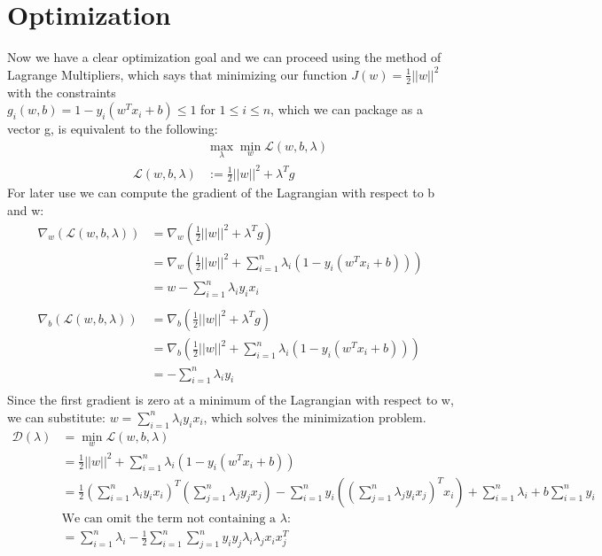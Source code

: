 \documentclass[12pt]{article}
\begin{document}
\section*{Optimization}
Now we have a clear optimization goal and we can proceed using the method of Lagrange Multipliers,
which says that minimizing our function $J(w) = \frac{1}{2}||w||^2$ with the constraints  \\ $g_i(w, b) = 1 - y_i(w^Tx_i + b) \leq 1$
for $1 \leq i \leq n$, which we can package as a vector g, is equivalent to the following:
\begin{align*}
    &\displaystyle \max_{\lambda} \min_w \mathcal{L}(w, b, \lambda) \\
    \mathcal{L}(w, b, \lambda) &:= \frac{1}{2}||w||^2  + \lambda^T g
\end{align*}
For later use we can compute the gradient of the Lagrangian with respect to b and w:
\begin{align*}
    \nabla_w (\mathcal{L}(w, b, \lambda)) &= \nabla_w(\frac{1}{2}||w||^2  + \lambda^T g) \\
    &= \nabla_w(\frac{1}{2}||w||^2  + \displaystyle \sum_{i=1}^{n} \lambda_i(1 - y_i(w^Tx_i + b))) \\
    &= w -  \displaystyle \sum_{i=1}^{n} \lambda_iy_ix_i \\
    \\
    \nabla_b (\mathcal{L}(w, b, \lambda)) &= \nabla_b(\frac{1}{2}||w||^2  + \lambda^T g) \\
    &= \nabla_b(\frac{1}{2}||w||^2  + \displaystyle \sum_{i=1}^{n} \lambda_i(1 - y_i(w^Tx_i + b))) \\
    &= -\displaystyle \sum_{i=1}^{n} \lambda_iy_i \\
\end{align*}
Since the first gradient is zero at a minimum of the Lagrangian with respect to w, we can substitute:
$w = \displaystyle \sum_{i=1}^{n} \lambda_iy_ix_i$, which solves the minimization problem.
\begin{align*}
    \mathcal{D}(\lambda) &= \displaystyle \min_w \mathcal{L}(w, b, \lambda)  \\
    &= \frac{1}{2}||w||^2  + \displaystyle \sum_{i=1}^{n} \lambda_i(1 - y_i(w^Tx_i + b)) \\
    &= \frac{1}{2}(\displaystyle \sum_{i=1}^{n} \lambda_iy_ix_i)^T(\displaystyle \sum_{j=1}^{n} \lambda_jy_jx_j) -  \sum_{i=1}^{n} y_i((\sum_{j=1}^{n} \lambda_jy_ix_j)^Tx_i) + \sum_{i=1}^{n} \lambda_i +  b\sum_{i=1}^{n} y_i \\
    &\text{We can omit the term not containing a $\lambda$:} \\
    &= \displaystyle \sum_{i = 1}^n \lambda_i - \frac{1}{2} \sum_{i = 1}^n \sum_{j = 1}^n y_iy_j\lambda_i\lambda_jx_ix_j^T
\end{align*}
\end{document}
